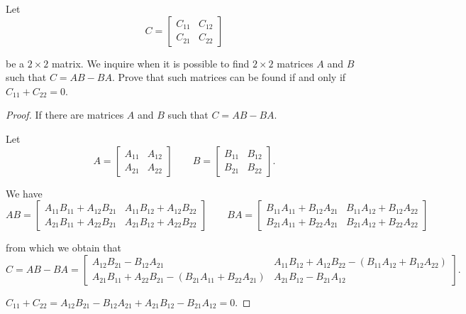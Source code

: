 \begin{exercise}
    Let
    \[
        C = \begin{bmatrix}
            C_{11} & C_{12} \\
            C_{21} & C_{22}
        \end{bmatrix}
    \]

    be a $2\times 2$ matrix. We inquire when it is possible to find $2\times 2$ matrices $A$ and $B$ such that $C = AB - BA$. Prove that such matrices can be found if and only if $C_{11} + C_{22} = 0$.
\end{exercise}

\begin{proof}
    If there are matrices $A$ and $B$ such that $C = AB - BA$.

    Let
    \[
        A = \begin{bmatrix}
            A_{11} & A_{12} \\
            A_{21} & A_{22}
        \end{bmatrix}
        \qquad
        B = \begin{bmatrix}
            B_{11} & B_{12} \\
            B_{21} & B_{22}
        \end{bmatrix}.
    \]

    We have
    \[
        AB = \begin{bmatrix}
            A_{11}B_{11} + A_{12}B_{21} & A_{11}B_{12} + A_{12}B_{22} \\
            A_{21}B_{11} + A_{22}B_{21} & A_{21}B_{12} + A_{22}B_{22}
        \end{bmatrix}
        \qquad
        BA = \begin{bmatrix}
            B_{11}A_{11} + B_{12}A_{21} & B_{11}A_{12} + B_{12}A_{22} \\
            B_{21}A_{11} + B_{22}A_{21} & B_{21}A_{12} + B_{22}A_{22}
        \end{bmatrix}
    \]

    from which we obtain that
    \[
        C = AB - BA =
        \begin{bmatrix}
            A_{12}B_{21} - B_{12}A_{21}                                 & A_{11}B_{12} + A_{12}B_{22} - (B_{11}A_{12} + B_{12}A_{22}) \\
            A_{21}B_{11} + A_{22}B_{21} - (B_{21}A_{11} + B_{22}A_{21}) & A_{21}B_{12} - B_{21}A_{12}
        \end{bmatrix}.
    \]

    $C_{11} + C_{22} = A_{12}B_{21} - B_{12}A_{21} + A_{21}B_{12} - B_{21}A_{12} = 0$.


\end{proof}
